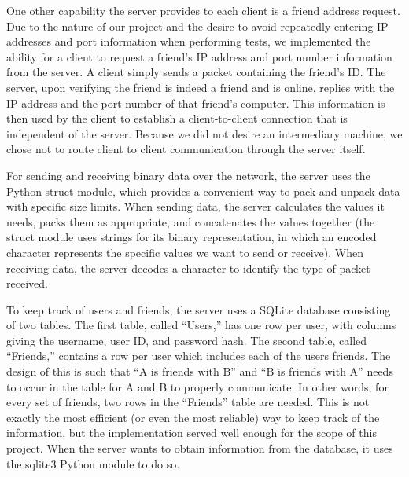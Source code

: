 One other capability the server provides to each client is a friend address request. Due to
the nature of our project and the desire to avoid repeatedly entering IP
addresses and port information
when performing tests, we implemented the ability for a client to request a friend's IP 
address and port number
information from the server. A client simply sends a packet containing the
friend's ID. The server, upon verifying the friend is indeed a friend and is
online, replies with the IP address and the port number of that friend's computer. This information is then used
by the client to establish a client-to-client connection that is independent of the 
server. Because we did not desire an intermediary machine, we chose not to route client to client
communication through the server itself.

For sending and receiving binary data over the network, the server uses the Python struct
module, which provides a convenient way to pack and unpack data with specific size
limits. When sending data, the server calculates the values it needs, packs them as
appropriate, and concatenates the values together (the struct module uses strings
for its binary representation, in which an encoded character represents the specific values
we want to send or receive). When receiving data, the server decodes a character
to identify the type of packet received.

To keep track of users and friends, the server uses a SQLite database consisting of
two tables. The first table, called ``Users,'' has one row per user, with columns
giving the username, user ID, and password hash. The second table, called ``Friends,''
contains a row per user which includes each of the users friends. The design of this is such
that ``A is friends with B'' and ``B is friends with A'' needs to occur in the table
for A and B to properly communicate. In other words, for every set of friends, two rows
in the ``Friends'' table are needed. This is not exactly the most efficient (or even the
most reliable) way to keep track of the information, but the implementation served well enough
for the scope of this project. When the server wants to obtain information from the
database, it uses the sqlite3 Python module to do so. 
